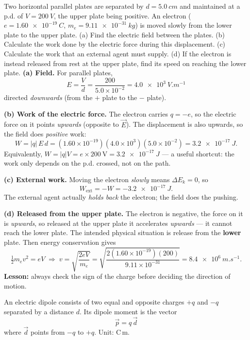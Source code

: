 \documentclass[11pt]{article}
\newcommand{\cle}[1]{{\popxbold\color{popdark}#1}}
\newcounter{popsec}
\newcounter{popsub}
\newcommand{\courssub}[1]{%
  \stepcounter{popsub}%
  \par\vspace{9pt}\noindent{\popxbold\fontsize{11.5}{13}\selectfont\color{popink}{\color{poporange}\thepopsec.\thepopsub}\hspace{6pt}#1}\par\nopagebreak\vspace{4pt}
}
\begin{document}
\begin{exoresolu}
Two horizontal parallel plates are separated by $d = \SI{5.0}{cm}$ and maintained at a p.d. of $V = \SI{200}{V}$, the upper plate being positive. An electron ($e = \SI{1.60e-19}{C}$, $m_e = \SI{9.11e-31}{kg}$) is moved slowly from the lower plate to the upper plate. (a) Find the electric field between the plates. (b) Calculate the work done by the electric force during this displacement. (c) Calculate the work that an external agent must supply. (d) If the electron is instead released from rest at the upper plate, find its speed on reaching the lower plate.
\tcblower
\textbf{(a) Field.} For parallel plates,
\[ E = \frac{V}{d} = \frac{200}{5.0\times10^{-2}} = \SI{4.0e3}{V.m^{-1}} \]
directed \emph{downwards} (from the $+$ plate to the $-$ plate).

\textbf{(b) Work of the electric force.} The electron carries $q=-e$, so the electric force on it points \emph{upwards} (opposite to $\vec{E}$). The displacement is also upwards, so the field does \emph{positive} work:
\[ W = |q|\,E\,d = (1.60\times10^{-19})(4.0\times10^{3})(5.0\times10^{-2}) = \SI{3.2e-17}{J}. \]
Equivalently, $W = |q|V = e \times 200\ \mathrm{V} = \SI{3.2e-17}{J}$ — a useful shortcut: the work only depends on the p.d. crossed, not on the path.

\textbf{(c) External work.} Moving the electron \emph{slowly} means $\Delta E_k = 0$, so
\[ W_{\text{ext}} = -W = \SI{-3.2e-17}{J}. \]
The external agent actually \emph{holds back} the electron; the field does the pushing.

\textbf{(d) Released from the upper plate.} The electron is negative, the force on it is \emph{upwards}, so released at the upper plate it accelerates \emph{upwards} — it cannot reach the lower plate. The intended physical situation is release from the \textbf{lower} plate. Then energy conservation gives
\[ \tfrac{1}{2}m_e v^2 = eV \;\Rightarrow\; v = \sqrt{\frac{2eV}{m_e}} = \sqrt{\frac{2(1.60\times10^{-19})(200)}{9.11\times10^{-31}}} = \SI{8.4e6}{m.s^{-1}}. \]
\textbf{Lesson:} always check the sign of the charge before deciding the direction of motion.
\end{exoresolu}

\courssub{Skill 2 — Torque on an electric dipole}

\begin{definition}
An \cle{electric dipole} consists of two equal and opposite charges $+q$ and $-q$ separated by a distance $d$. Its \cle{dipole moment} is the vector
\[ \vec{p} = q\,\vec{d} \]
where $\vec{d}$ points from $-q$ to $+q$. Unit: $\mathrm{C\,m}$.
\end{definition}
\end{document}
